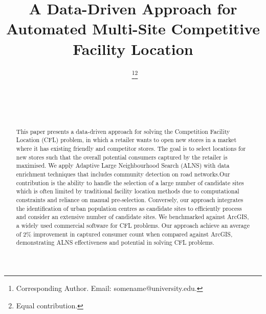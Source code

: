 \documentclass{ecai}
\begin{document}

\begin{frontmatter}




\title{A Data-Driven Approach for \\ Automated Multi-Site Competitive Facility Location}


\author[A]{~\thanks{Corresponding Author. Email: somename@university.edu.}\footnote{Equal contribution.}}
\author[B]{~\footnotemark}
\author[B,C]{~} 

\address[A]{Short Affiliation of First Author}
\address[B]{Short Affiliation of Second Author and Third Author}
\address[C]{Short Alternate Affiliation of Third Author}


\begin{abstract}
This paper presents a data-driven approach for solving the Competition Facility Location (CFL) problem, in which a retailer wants to open new stores in a market where it has existing friendly and competitor stores. The goal is to select locations for new stores such that the overall potential consumers captured by the retailer is maximised. We apply Adaptive Large Neighbourhood Search (ALNS) with data enrichment techniques that includes community detection on road networks.Our contribution is the ability to handle the selection of a large number of candidate sites which is often limited by traditional facility location methods due to computational constraints and reliance on manual pre-selection. Conversely, our approach integrates the identification of urban population centres as candidate sites to efficiently process and consider an extensive number of candidate sites. We benchmarked against ArcGIS, a widely used commercial software for CFL problems. Our approach achieve an average of 2\% improvement in captured consumer count when compared against ArcGIS, demonstrating ALNS effectiveness and potential in solving CFL problems.


\end{abstract}
\end{frontmatter}
\end{document}
